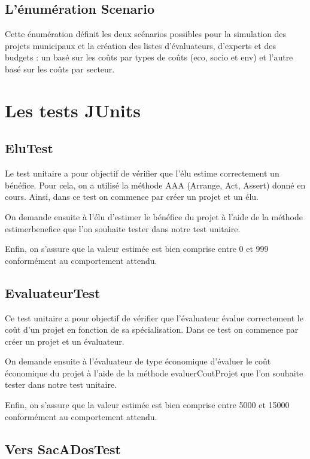 \documentclass[11pt]{article}
\begin{document}
\subsection{L'énumération Scenario}

Cette énumération définit les deux scénarios possibles pour la simulation des projets municipaux et la création des listes d’évaluateurs, d’experts et des budgets : un basé sur les coûts par types de coûts (eco, socio et env) et l’autre basé sur les coûts par secteur.


\section{Les tests JUnits}

\subsection{EluTest}
Le test unitaire a pour objectif de vérifier que l’élu estime correctement un bénéfice. Pour cela, on a utilisé la méthode AAA (Arrange, Act, Assert) donné en cours. Ainsi, dans ce test on commence par créer un projet et un élu. 

On demande ensuite à l’élu d’estimer le bénéfice du projet à l’aide de la méthode estimerbenefice que l’on souhaite tester dans notre test unitaire. 

Enfin, on s’assure que la valeur estimée est bien comprise entre 0 et 999 conformément au comportement attendu. 

\subsection{EvaluateurTest}
Ce test unitaire a pour objectif de vérifier que l’évaluateur évalue correctement le coût d’un projet en fonction de sa spécialisation. Dans ce test on commence par créer un projet et un évaluateur.

On demande ensuite à l’évaluateur de type économique d’évaluer le coût économique du projet à l’aide de la méthode evaluerCoutProjet que l’on souhaite tester dans notre test unitaire. 

Enfin, on s’assure que la valeur estimée est bien comprise entre 5000 et 15000 conformément au comportement attendu. 

\subsection{Vers SacADosTest}
\end{document}
